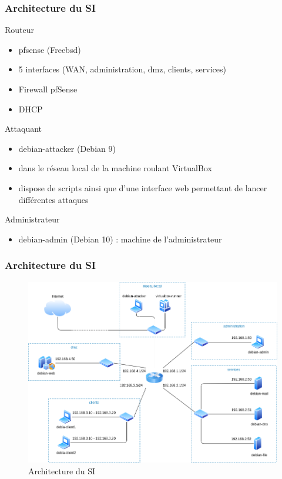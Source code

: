 \documentclass{beamer}
\begin{document}
		\begin{frame}
			\frametitle{Architecture du SI}
			\begin{block}{Routeur}
				\begin{itemize}
					\item pfsense (Freebsd)
					\item 5 interfaces (WAN, administration, dmz, clients, services)
					\item Firewall pfSense
					\item DHCP
				\end{itemize}
			\end{block}
			\begin{block}{Attaquant}
				\begin{itemize}
					\item debian-attacker (Debian 9)
					\item dans le réseau local de la machine roulant VirtualBox
					\item dispose de scripts ainsi que d'une interface web permettant de lancer différentes attaques
				\end{itemize}
			\end{block}
			\begin{block}{Administrateur}
				\begin{itemize}
					\item debian-admin (Debian 10) : machine de l'administrateur
				\end{itemize}
			\end{block}
		\end{frame}
		\begin{frame}
			\frametitle{Architecture du SI}
			\begin{center}
				\begin{figure}
					\includegraphics[scale=.3]{si.png}
					\caption{Architecture du SI}
				\end{figure}
			\end{center}
		\end{frame}
\end{document}
